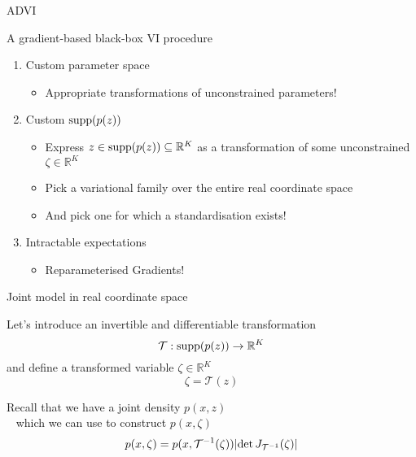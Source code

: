 \documentclass[14pt,dvipsnames]{beamer}
\newcommand{\galert}[1]{\textcolor{PineGreen}{#1}}
\begin{document}
\begin{frame}{ADVI}
	
	A gradient-based black-box VI procedure \pause
	\begin{enumerate}		
		\item \alert{Custom parameter space} \pause
			\begin{itemize}
				\item \galert{Appropriate transformations of unconstrained parameters!} \pause
			\end{itemize}
		\item \alert{Custom $\operatorname{supp}(p(z))$} \pause
			\begin{itemize}
				\item \galert{Express $z \in \operatorname{supp}(p(z)) \subseteq \mathbb R^K$ as a transformation of some unconstrained $\zeta \in \mathbb R^K$} \pause
				\item \galert{Pick a variational family over the entire real coordinate space} \pause
				\item \galert{And pick one for which a standardisation exists!} \pause
			\end{itemize}
		\item \alert{Intractable expectations} \pause
			\begin{itemize}
				\item \galert{Reparameterised Gradients!} 
			\end{itemize}
	\end{enumerate}
		
\end{frame}

\begin{frame}{Joint model in real coordinate space}

	Let's introduce an invertible and differentiable transformation
	\begin{equation*}
		\mathcal T: \operatorname{supp}(p(z)) \to \mathbb R^K
	\end{equation*} \pause
	 and define a transformed variable $\zeta \in \mathbb R^K$
	\begin{equation*}
		\zeta = \mathcal T(z)
 	\end{equation*} \pause
	
	\vspace{-10pt}	
	
	Recall that we have a joint density $p(x,z)$\\ \pause
	~ which we can use to construct $p(x, \zeta)$ \pause
	\begin{equation*}
		p(x, \zeta) = p(x, {\mathcal T}^{-1}(\zeta)) \abs{\det J_{{\mathcal T}^{-1}}(\zeta)}
	\end{equation*}
\end{frame}
\end{document}
